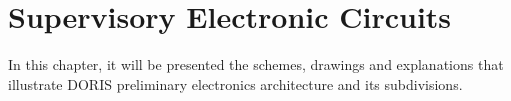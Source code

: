 



\chapter{Supervisory Electronic Circuits}
In this chapter, it will be presented the schemes, drawings and explanations that illustrate DORIS preliminary electronics architecture and its subdivisions.




